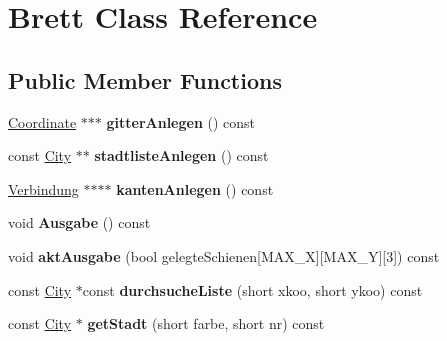 \hypertarget{class_brett}{\section{Brett Class Reference}
\label{class_brett}
}
\subsection*{Public Member Functions}
\begin{DoxyCompactItemize}
\item 
\hypertarget{class_brett_a72bbf86800d1f477b9e4625d325e465a}{\hyperlink{class_coordinate}{Coordinate} $\ast$$\ast$$\ast$ {\bfseries gitter\-Anlegen} () const }\label{class_brett_a72bbf86800d1f477b9e4625d325e465a}

\item 
\hypertarget{class_brett_ab326ab4994f8227a6d28a8de09a4d4e5}{const \hyperlink{class_city}{City} $\ast$$\ast$ {\bfseries stadtliste\-Anlegen} () const }\label{class_brett_ab326ab4994f8227a6d28a8de09a4d4e5}

\item 
\hypertarget{class_brett_ae6144255642555208de19a5c967ab145}{\hyperlink{class_verbindung}{Verbindung} $\ast$$\ast$$\ast$$\ast$ {\bfseries kanten\-Anlegen} () const }\label{class_brett_ae6144255642555208de19a5c967ab145}

\item 
\hypertarget{class_brett_af4526c6857f25f88a38e58f025d4baa1}{void {\bfseries Ausgabe} () const }\label{class_brett_af4526c6857f25f88a38e58f025d4baa1}

\item 
\hypertarget{class_brett_ac3511a492cf4f2fab2318fb0e05bd886}{void {\bfseries akt\-Ausgabe} (bool gelegte\-Schienen\mbox{[}M\-A\-X\-\_\-\-X\mbox{]}\mbox{[}M\-A\-X\-\_\-\-Y\mbox{]}\mbox{[}3\mbox{]}) const }\label{class_brett_ac3511a492cf4f2fab2318fb0e05bd886}

\item 
\hypertarget{class_brett_a3d69a2d912d12dd9929a6decffce4c98}{const \hyperlink{class_city}{City} $\ast$const {\bfseries durchsuche\-Liste} (short xkoo, short ykoo) const }\label{class_brett_a3d69a2d912d12dd9929a6decffce4c98}

\item 
\hypertarget{class_brett_a8853bb48bdea6ff1807f32a899a98a65}{const \hyperlink{class_city}{City} $\ast$ {\bfseries get\-Stadt} (short farbe, short nr) const }\label{class_brett_a8853bb48bdea6ff1807f32a899a98a65}

\end{DoxyCompactItemize}
